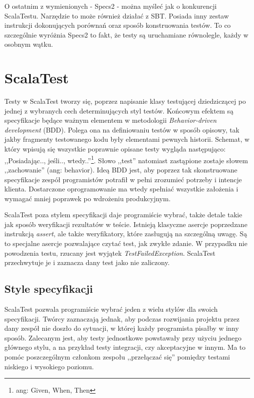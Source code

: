 \documentclass[brudnopis]{xmgr}
\begin{document}
O ostatnim z wymienionych - Specs2 - można myśleć jak o konkurencji ScalaTestu. Narzędzie to może również działać z SBT. Posiada inny zestaw instrukcji dokonujących porównań oraz sposób konstruowania testów. To co szczególnie wyróżnia Specs2 to fakt, że testy są uruchamiane równolegle, każdy w osobnym wątku.
      
\section{ScalaTest}

Testy w ScalaTest tworzy się, poprzez napisanie klasy testującej dziedziczącej po jednej z wybranych cech determinujących styl testów. Końcowym efektem są specyfikacje będące ważnym elementem w metodologii \emph{Behavior-driven development} (BDD). Polega ona na definiowaniu testów w sposób opisowy, tak jakby fragmenty testowanego kodu były elementami pewnych historii. Schemat, w który wpisują się wszystkie poprawnie opisane testy wygląda następująco: ,,Posiadając.., jeśli.., wtedy..''\footnote{ang: Given, When, Then}. Słowo ,,test'' natomiast zastąpione zostaje słowem ,,zachowanie'' (ang: behavior). Ideą BDD jest, aby poprzez tak skonstruowane specyfikacje zespół programistów potrafił w pełni zrozumieć potrzeby i intencje klienta. Dostarczone oprogramowanie ma wtedy spełniać wszystkie założenia i wymagać mniej poprawek po wdrożeniu produkcyjnym.

ScalaTest poza stylem specyfikacji daje programiście wybrać, także detale takie jak sposób weryfikacji rezultatów w teście. Istnieją klasyczne asercje poprzedzane instrukcją \emph{assert}, ale także weryfikatory, które zasługują na szczególną uwagę. Są to specjalne asercje pozwalające czytać test, jak zwykłe zdanie. W przypadku nie powodzenia testu, rzucany jest wyjątek \emph{TestFailedException}. ScalaTest przechwytuje je i zaznacza dany test jako nie zaliczony.

\subsection{Style specyfikacji}

ScalaTest pozwala programiście wybrać jeden z wielu stylów dla swoich specyfikacji. Twórcy zaznaczają jednak, aby podczas rozwijania projektu przez dany zespół nie doszło do sytuacji, w której każdy programista pisałby w inny sposób. Zalecanym jest, aby testy jednostkowe powstawały przy użyciu jednego głównego stylu, a na przykład testy integracji, czy akceptacyjne w innym. Ma to pomóc poszczególnym członkom zespołu ,,przełączać się'' pomiędzy testami niskiego i wysokiego poziomu.
\end{document}
